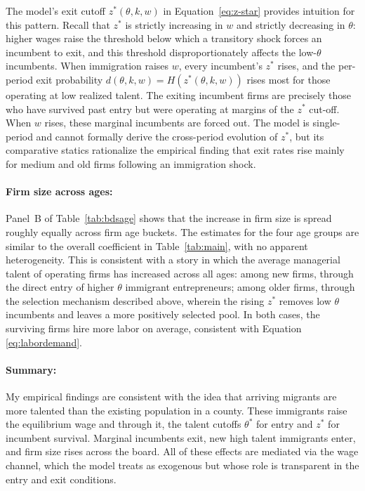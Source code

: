     The model's exit cutoff $z^{*}(\theta,k,w)$ in Equation~\eqref{eq:z-star} provides intuition for this pattern. Recall that $z^{*}$ is strictly increasing in $w$ and strictly decreasing in $\theta$: higher wages raise the threshold below which a transitory shock forces an incumbent to exit, and this threshold disproportionately affects the low-$\theta$ incumbents. When immigration raises $w$, every incumbent's $z^{*}$ rises, and the per-period exit probability $d(\theta,k,w)=H(z^{*}(\theta,k,w))$ rises most for those operating at low realized talent. The exiting incumbent firms are precisely those who have survived past entry but were operating at margins of the $z^*$ cut-off. When $w$ rises, these marginal incumbents are forced out. The model is single-period and cannot formally derive the cross-period evolution of $z^{*}$, but its comparative statics rationalize the empirical finding that exit rates rise mainly for medium and old firms following an immigration shock.

    \paragraph{Firm size across ages:} Panel~B of Table~\ref{tab:bdsage} shows that the increase in firm size is spread roughly equally across firm age buckets. The estimates for the four age groups are similar to the overall coefficient in Table~\ref{tab:main}, with no apparent heterogeneity. This is consistent with a story in which the average managerial talent of operating firms has increased across all ages: among new firms, through the direct entry of higher $\theta$ immigrant entrepreneurs; among older firms, through the selection mechanism described above, wherein the rising $z^{*}$ removes low $\theta$ incumbents and leaves a more positively selected pool. In both cases, the surviving firms hire more labor on average, consistent with Equation \eqref{eq:labordemand}.

    \paragraph{Summary:} My empirical findings are consistent with the idea that arriving migrants are more talented than the existing population in a county. These immigrants raise the equilibrium wage and through it, the talent cutoffs $\theta^{*}$ for entry and $z^{*}$ for incumbent survival. Marginal incumbents exit, new high talent immigrants enter, and firm size rises across the board. All of these effects are mediated via the wage channel, which the model treats as exogenous but whose role is transparent in the entry and exit conditions.


